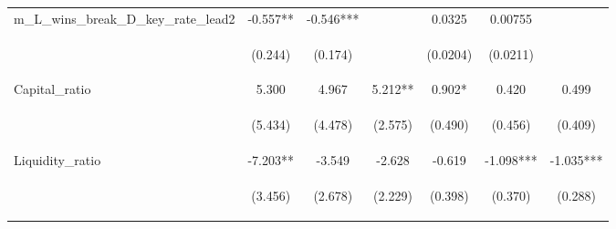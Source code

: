 \documentclass[]{article}
\begin{document}
\begin{center}
\begin{tabular}{lcccccc}
m\_L\_wins\_break\_D\_key\_rate\_lead2 & -0.557** & -0.546*** &  & 0.0325 & 0.00755 &  \\
\vspace{4pt} & \begin{footnotesize}(0.244)\end{footnotesize} & \begin{footnotesize}(0.174)\end{footnotesize} & \begin{footnotesize}\end{footnotesize} & \begin{footnotesize}(0.0204)\end{footnotesize} & \begin{footnotesize}(0.0211)\end{footnotesize} & \begin{footnotesize}\end{footnotesize} \\
Capital\_ratio & 5.300 & 4.967 & 5.212** & 0.902* & 0.420 & 0.499 \\
\vspace{4pt} & \begin{footnotesize}(5.434)\end{footnotesize} & \begin{footnotesize}(4.478)\end{footnotesize} & \begin{footnotesize}(2.575)\end{footnotesize} & \begin{footnotesize}(0.490)\end{footnotesize} & \begin{footnotesize}(0.456)\end{footnotesize} & \begin{footnotesize}(0.409)\end{footnotesize} \\
Liquidity\_ratio & -7.203** & -3.549 & -2.628 & -0.619 & -1.098*** & -1.035*** \\
\vspace{4pt} & \begin{footnotesize}(3.456)\end{footnotesize} & \begin{footnotesize}(2.678)\end{footnotesize} & \begin{footnotesize}(2.229)\end{footnotesize} & \begin{footnotesize}(0.398)\end{footnotesize} & \begin{footnotesize}(0.370)\end{footnotesize} & \begin{footnotesize}(0.288)\end{footnotesize} \\

\end{tabular}
\end{center}
\end{document}
